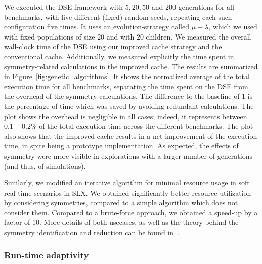 \documentclass[sigplan,10pt]{acmart}
\begin{document}
We executed the DSE framework with $5, 20, 50$ and $200$ generations for all benchmarks, with five different (fixed) random seeds, repeating each such configuration five times.
It uses an evolution-strategy called $\mu + \lambda$, which we used with fixed populations of size $20$ and with $20$ children.
We measured the overall wall-clock time of the DSE using our improved cache strategy and the conventional cache. Additionally, we
measured explicitly the time spent in symmetry-related calculations in the improved cache. The results are summarized in Figure~\ref{fig:genetic_algorithms}.
It shows the normalized average of the total execution time for all benchmarks, separating the time spent on the DSE from the overhead of the symmetry calculations. 
The difference to the baseline of $1$ is the percentage of time which was saved by avoiding redundant calculations.
The plot shows the overhead is negligible in all cases; indeed, it represents between $0.1-0.2 \%$ of the total execution time across the different benchmarks.
The plot also shows that the improved cache results in a net improvement of the execution time, in spite being a prototype implementation. 
As expected, the effects of symmetry were more visible in explorations with a larger number of generations (and thus, of simulations).

Similarly, we modified an iterative algorithm for minimal resource usage in soft real-time scenarios in SLX.
We obtained significantly better resource utilization by considering symmetries, compared to a simple algorithm which does not consider them. 
Compared to a brute-force approach, we obtained a speed-up by a factor of $10$.
More details of both usecases, as well as the theory behind the symmetry identification and reduction can be found in~\cite{goens_taco17}.

\subsubsection{Run-time adaptivity}
\end{document}
